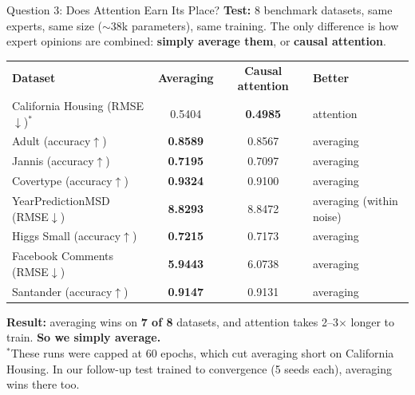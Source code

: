 \documentclass[aspectratio=169, xcolor=table]{beamer}
\begin{document}
\begin{frame}{Question 3: Does Attention Earn Its Place?}
    \small
    \textbf{Test:} 8 benchmark datasets, same experts, same size ($\sim$38k parameters), same training.
    The only difference is how expert opinions are combined: \textbf{simply average them}, or \textbf{causal attention}.
    \vspace{0.1cm}
    \begin{table}
        \centering
        \renewcommand{\arraystretch}{1.12}
        \footnotesize
        \begin{tabular}{l | c | c | l}
            \rowcolor{PrimaryColor} \color{white}\textbf{Dataset} & \color{white}\textbf{Averaging} & \color{white}\textbf{Causal attention} & \color{white}\textbf{Better} \\
            California Housing (RMSE$\downarrow$)$^{*}$ & 0.5404 & \textbf{0.4985} & attention \\
            \rowcolor{LightGrey} Adult (accuracy$\uparrow$) & \textbf{0.8589} & 0.8567 & averaging \\
            Jannis (accuracy$\uparrow$) & \textbf{0.7195} & 0.7097 & averaging \\
            \rowcolor{LightGrey} Covertype (accuracy$\uparrow$) & \textbf{0.9324} & 0.9100 & averaging \\
            YearPredictionMSD (RMSE$\downarrow$) & \textbf{8.8293} & 8.8472 & averaging (within noise) \\
            \rowcolor{LightGrey} Higgs Small (accuracy$\uparrow$) & \textbf{0.7215} & 0.7173 & averaging \\
            Facebook Comments (RMSE$\downarrow$) & \textbf{5.9443} & 6.0738 & averaging \\
            \rowcolor{LightGrey} Santander (accuracy$\uparrow$) & \textbf{0.9147} & 0.9131 & averaging \\
        \end{tabular}
    \end{table}
    \vspace{-0.1cm}
    \textbf{Result:} averaging wins on \textbf{7 of 8} datasets, and attention takes 2--3$\times$ longer to train.
    \textbf{So we simply average.}\\[0.1cm]
    \tiny $^{*}$These runs were capped at 60 epochs, which cut averaging short on California Housing. In our follow-up
    test trained to convergence (5 seeds each), averaging wins there too.
\end{frame}
\end{document}
